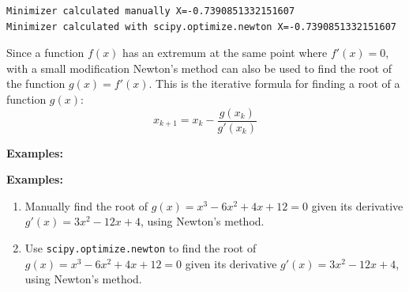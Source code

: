 \documentclass[11pt]{article}
\begin{document}
    \begin{Verbatim}[commandchars=\\\{\}]
Minimizer calculated manually X=-0.7390851332151607
Minimizer calculated with scipy.optimize.newton X=-0.7390851332151607
    \end{Verbatim}

    Since a function \(f(x)\) has an extremum at the same point where
\(f'(x) = 0\), with a small modification Newton's method can also be
used to find the root of the function \(g(x) = f'(x)\). This is the
iterative formula for finding a root of a function \(g(x)\): \[
x_{k+1} = x_k - \frac{g(x_k)}{g'(x_k)}
\]

\newpage

\textbf{Examples:}

\textbf{Examples:}

\begin{enumerate}
\def\labelenumi{\arabic{enumi}.}
\item
  Manually find the root of \(g(x) = x^3 - 6x^2 + 4x + 12 = 0\) given
  its derivative \(g'(x) = 3x^2 - 12x + 4\), using Newton's method.
\item
  Use \texttt{scipy.optimize.newton} to find the root of
  \(g(x) = x^3 - 6x^2 + 4x + 12 = 0\) given its derivative
  \(g'(x) = 3x^2 - 12x + 4\), using Newton's method.
\end{enumerate}
\end{document}

